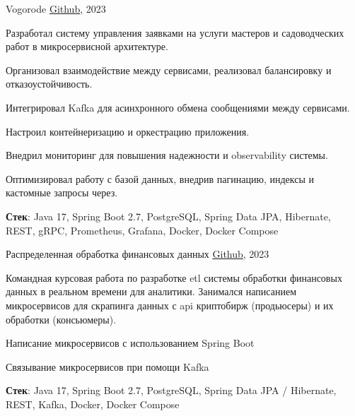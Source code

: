 \begin{cventries}

\cventry
  {}
  {Vogorode}
  {\href{https://github.com/ArchieSW/vogorode}{\underline{Github}}, 2023}
  {}
  {
    \vspace{-5mm}
    \begin{cvitems}
      \item {Разработал систему управления заявками на услуги мастеров и садоводческих работ в микросервисной архитектуре.}
      \item {Организовал взаимодействие между сервисами, реализовал балансировку и отказоустойчивость.}
      \item {Интегрировал Kafka для асинхронного обмена сообщениями между сервисами.}
      \item {Настроил контейнеризацию и оркестрацию приложения.}
      \item {Внедрил мониторинг для повышения надежности и observability системы.}
      \item {Оптимизировал работу с базой данных, внедрив пагинацию, индексы и кастомные запросы через.}
      \item {\textbf{Стек}: Java 17, Spring Boot 2.7, PostgreSQL, Spring Data JPA, Hibernate, REST, gRPC, Prometheus, Grafana, Docker, Docker Compose}
    \end{cvitems}
  }

 \vspace{1em}

  \cventry
    {}
    {Распределенная обработка финансовых данных}
    {\href{https://github.com/HSECourseWork2022}{\underline{Github}}, 2023}
    {}
    {
      \vspace{-5mm}
      \begin{cvitems}
        \item {Командная курсовая работа по разработке etl системы обработки финансовых данных в реальном времени для аналитики.
         Занимался написанием микросервисов для скрапинга данных с api криптобирж (продьюсеры) и их обработки (консьюмеры).}
        \item {Написание микросервисов с использованием Spring Boot}
        \item {Связывание микросервисов при помощи Kafka}
        \item {\textbf{Стек}: Java 17, Spring Boot 2.7, PostgreSQL, Spring Data JPA / Hibernate, REST, Kafka, Docker, Docker Compose}
      \end{cvitems}
    }

\end{cventries}
